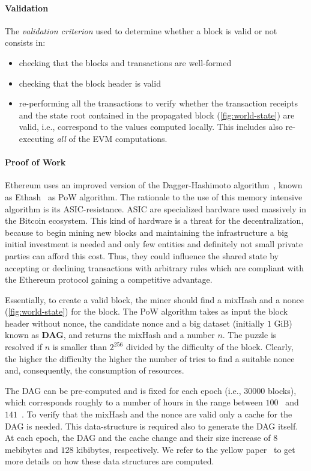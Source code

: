 \paragraph{Validation}
The \emph{validation criterion} used to determine whether a block is valid or
not consists in:
\begin{itemize}
  \item checking that the blocks and transactions are well-formed
  \item checking that the block header is valid
  \item re-performing all the transactions to verify whether the transaction
  receipts and the state root contained in the propagated block
  (\autoref{fig:world-state}) are valid, i.e., correspond to the values computed
  locally. This includes also re-executing \emph{all} of the EVM computations.
\end{itemize}

\paragraph{Proof of Work}
\label{sec:pow}
Ethereum uses an improved version of the Dagger-Hashimoto
algorithm~\cite{bib:dagger-hashimoto}, known as Ethash~\cite[Appendix
J]{wood2018ethereum} as PoW algorithm. The rationale to the use of this memory
intensive algorithm is its ASIC-resistance. ASIC are specialized hardware used
massively in the Bitcoin ecosystem. This kind of hardware is a threat for the
decentralization, because to begin mining new blocks and maintaining the
infrastructure a big initial investment is needed and only few entities and
definitely not small private parties can afford this cost. Thus, they could
influence the shared state by accepting or declining transactions with arbitrary
rules which are compliant with the Ethereum protocol gaining a competitive
advantage.

Essentially, to create a valid block, the miner should find a mixHash and a
nonce (\autoref{fig:world-state}) for the block. The PoW algorithm takes as
input the block header without nonce, the candidate nonce and a big dataset
(initially $1$ GiB) known as \textbf{DAG}, and returns the mixHash and a number
$n$. The puzzle is resolved if $n$ is smaller than $2^{256}$ divided by the
difficulty of the block. Clearly, the higher the difficulty the higher the
number of tries to find a suitable nonce and, consequently, the consumption of
resources.

The DAG can be pre-computed and is fixed for each epoch (i.e., $30000$ blocks),
which corresponds roughly to a number of hours in the range between
$100$~\cite{bib:ethereum-wiki-mining} and $141$~\cite{bib:solidity-docs}. To
verify that the mixHash and the nonce are valid only a cache for the DAG is
needed. This data-structure is required also to generate the DAG itself. At each
epoch, the DAG and the cache change and their size increase of $8$ mebibytes and
$128$ kibibytes, respectively. We refer to the yellow paper~\cite[Appendix
J]{wood2018ethereum} to get more details on how these data structures are
computed.



